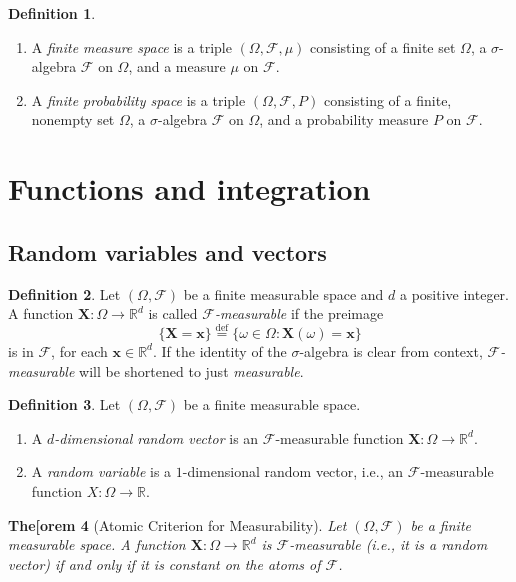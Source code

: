\documentclass[11pt]{book}
\newtheorem{thm}{The[orem}[section]
\theoremstyle{definition}
\newtheorem{defn}[thm]{Definition}
\numberwithin{equation}{section}
\begin{document}
\begin{defn}
	\leavevmode
	\begin{enumerate}
		\item A \textit{finite measure space} is a triple $(\Omega, \mathcal{F}, \mu)$ consisting of a finite set $\Omega$, a $\sigma$-algebra $\mathcal{F}$ on $\Omega$, and a measure $\mu$ on $\mathcal{F}$.
		\item A \textit{finite probability space} is a triple $(\Omega, \mathcal{F}, P)$ consisting of a finite, nonempty set $\Omega$, a $\sigma$-algebra $\mathcal{F}$ on $\Omega$, and a probability measure $P$ on $\mathcal{F}$.
	\end{enumerate}
\end{defn}

\section{Functions and integration}

\subsection{Random variables and vectors}

\begin{defn}
	Let $(\Omega, \mathcal{F})$ be a finite measurable space and $d$ a positive integer. A function $\mathbf{X}: \Omega \to \mathbb{R}^d$ is called \textit{$\mathcal{F}$-measurable} if the preimage
	\[
		\{\mathbf{X} = \mathbf{x}\} \stackrel{\text{def}}{=} \{ \omega \in \Omega : \mathbf{X}(\omega)=\mathbf{x}\}
	\]
	is in $\mathcal{F}$, for each $\mathbf{x}\in \mathbb{R}^d$. If the identity of the $\sigma$-algebra is clear from context, \textit{$\mathcal{F}$-measurable} will be shortened to just \textit{measurable}.
\end{defn}

\begin{defn}
	Let $(\Omega, \mathcal{F})$ be a finite measurable space.
	\begin{enumerate}
		\item A \textit{$d$-dimensional random vector} is an $\mathcal{F}$-measurable function $\mathbf{X}: \Omega \to \mathbb{R}^d$.
		\item A \textit{random variable} is a $1$-dimensional random vector, i.e., an $\mathcal{F}$-measurable function $X: \Omega \to \mathbb{R}$.
	\end{enumerate}
\end{defn}

\begin{thm}[Atomic Criterion for Measurability]\label{thm:atomic-criterion-measurable}
	Let $(\Omega, \mathcal{F})$ be a finite measurable space. A function $\mathbf{X}: \Omega \to \mathbb{R}^d$ is $\mathcal{F}$-measurable (i.e., it is a random vector) if and only if it is constant on the atoms of $\mathcal{F}$.
\end{thm}
\end{document}
